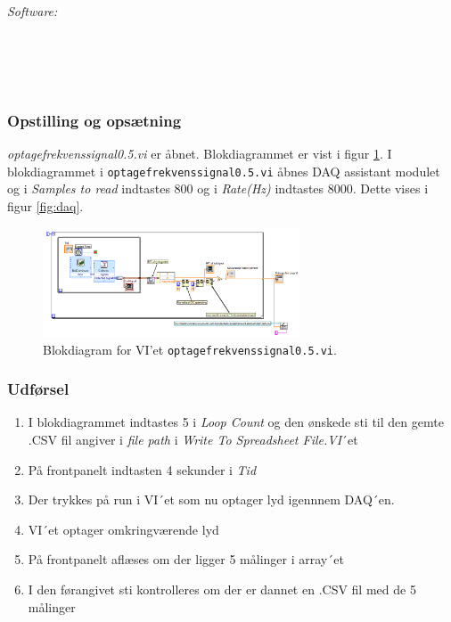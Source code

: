 		\textit{Software:}\\
		\labview\\
		\visa\\
		\vi\\
		\daqsoft\\

\subsubsection{Opstilling og opsætning}
		\textit{optagefrekvenssignal0.5.vi} er åbnet. Blokdiagrammet er vist i figur \ref{fig:vio5}. I blokdiagrammet i \texttt{optagefrekvenssignal0.5.vi} åbnes DAQ assistant modulet og i \textit{Samples to read} indtastes 800 og i \textit{Rate(Hz)} indtastes 8000. Dette vises i figur \ref{fig:daq}.   
		
		\begin{figure}[htb]

			\centering
			\includegraphics[width=3in]{VI05o}
			\caption{Blokdiagram for VI'et \texttt{optagefrekvenssignal0.5.vi}.}
			\label{fig:vio5}
		\end{figure}

\subsubsection{Udførsel}
	\begin{enumerate}
			\item I blokdiagrammet indtastes 5 i \textit{Loop Count} og den ønskede sti til den gemte .CSV fil angiver i \textit{file path} i \textit{Write To Spreadsheet File.VI}´et	
			\item På frontpanelt indtasten 4 sekunder i \textit{Tid} 		
			\item Der trykkes på run i VI´et som nu optager lyd igennnem DAQ´en.
			\item VI´et optager omkringværende lyd
			\item På frontpanelt aflæses om der ligger 5 målinger i array´et
			\item I den førangivet sti kontrolleres om der er dannet en .CSV fil med de 5 målinger 
			\end{enumerate}
			
